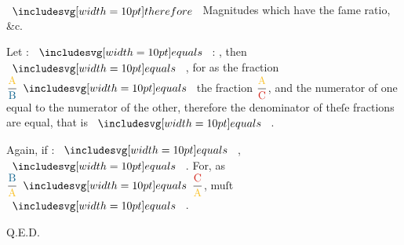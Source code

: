 \documentclass[12pt,preview]{standalone}
\begin{document}
\begin{minipage}{\textwidth}
    \hfill

    $\btherefore$ Magnitudes which have the ſame ratio, \&c.\\

\end{minipage}

\newpage

\begin{minipage}{\textwidth}
    Let {\color{cyellow}{A}} : {\color{cblue}{B}} $\bequals$ {\color{cyellow}{A}} : {\color{cred}{C}}, then {\color{cblue}{B}} $\bequals$ {\color{cred}{C}}, for as the fraction $\dfrac{\text{{\color{cyellow}{A}}}}{\text{{\color{cblue}{B}}}} \bequals$ the fraction $\dfrac{\text{{\color{cyellow}{A}}}}{\text{{\color{cred}{C}}}}$, and the numerator of one equal to the numerator of the other, therefore the denominator of theſe fractions are equal, that is {\color{cblue}{B}} $\bequals$ {\color{cred}{C}}.\\

    \hfill

    Again, if {\color{cblue}{B}} : {\color{cyellow}{A}} $\bequals$ {\color{cred}{C}}, {\color{cblue}{B}} $\bequals$ {\color{cred}{C}}. For, as $\dfrac{\text{{\color{cblue}{B}}}}{\text{{\color{cyellow}{A}}}} \bequals \dfrac{\text{{\color{cred}{C}}}}{\text{{\color{cyellow}{A}}}}$, {\color{cblue}{B}} muſt $\bequals$ {\color{cred}{C}}.\\

    \hfill

    \hfill Q.E.D.
\end{minipage}
\end{document}
